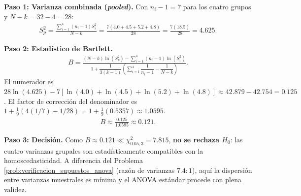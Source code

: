 \begin{solproblema}
	\textbf{Paso 1: Varianza combinada (\emph{pooled}).}
	Con $n_i - 1 = 7$ para los cuatro grupos y $N - k = 32 - 4 = 28$:
	\begin{align}
		S_p^2 = \frac{\sum_{i=1}^4 (n_i-1)S_i^2}{N-k} = \frac{7(4.0+4.5+5.2+4.8)}{28} = \frac{7(18.5)}{28} = 4.625.
	\end{align}

	\textbf{Paso 2: Estadístico de Bartlett.}
	\begin{align}
		B = \frac{(N-k)\ln(S_p^2) - \sum_{i=1}^4 (n_i-1)\ln(S_i^2)}{1 + \dfrac{1}{3(k-1)}\left(\sum_{i=1}^4 \dfrac{1}{n_i-1} - \dfrac{1}{N-k}\right)}.
	\end{align}
	El numerador es $28\ln(4.625) - 7[\ln(4.0)+\ln(4.5)+\ln(5.2)+\ln(4.8)] \approx 42.879 - 42.754 = 0.125$.
	El factor de corrección del denominador es $1 + \frac{1}{9}\left(4(1/7) - 1/28\right) = 1 + \frac{1}{9}(0.5357) \approx 1.0595$.
	\begin{align}
		B \approx \frac{0.125}{1.0595} \approx 0.121.
	\end{align}

	\textbf{Paso 3: Decisión.}
	Como $B \approx 0.121 \ll \chi^2_{0.05,3} = 7.815$, \textbf{no se rechaza $H_0$}: las cuatro varianzas grupales son estadísticamente compatibles con la homoscedasticidad. A diferencia del Problema \ref{prob:verificacion_supuestos_anova} (razón de varianzas $7.4:1$), aquí la dispersión entre varianzas muestrales es mínima y el ANOVA estándar procede con plena validez.
\end{solproblema}

